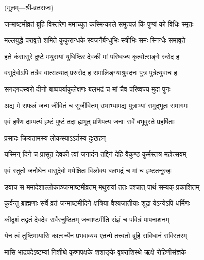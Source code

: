 \begingroup
\setlength{\parindent}{0pt}
\centerline{\small{(मूलम्—श्री-व्रतराजः)}}


\twolineshloka
{जन्माष्टमीव्रतं ब्रूहि विस्तरेण ममाच्युत}
{कस्मिन्काले समुत्पन्नं किं पुण्यं को विधिः स्मृतः}%

\twolineshloka
{मल्लयुद्धे परावृत्ते शमिते कुकुरान्धके}
{स्वजनैर्बन्धुभिः स्त्रीभिः समः स्निग्धैः समावृते}%

\twolineshloka
{हते कंसासुरे दुष्टे मथुरायां युधिष्ठिर}
{देवकी मां परिष्वज्य कृत्वोत्सङ्गे रुरोद ह}%

\twolineshloka
{वसुदेवोऽपि तत्रैव वात्सल्यात् प्ररुरोद ह}
{समालिङ्ग्याश्रुवदनः पुत्र पुत्रेत्युवाच ह}%

\twolineshloka
{सगद्गदस्वरो दीनो बाष्पपर्याकुलेक्षणः}
{बलभद्रं च मां चैव परिष्वज्य मुदा पुनः}%

\twolineshloka
{अद्य मे सफलं जन्म जीवितं च सुजीवितम्}
{उभाभ्यामद्य पुत्राभ्यां समुद्भूतः समागमः}%

\twolineshloka
{एवं हर्षेण दाम्पत्यं हृष्टं पुष्टं तदा ह्यभूत्}
{प्रणिपत्य जनाः सर्वे बभूवुस्ते प्रहर्षिताः}%

\onelineshloka
{प्रसादः क्रियतामस्य लोकस्याऽऽर्तस्य दुःखहन्}%

\twolineshloka
{यस्मिन् दिने च प्रासूत देवकी त्वां जनार्दन}
{तद्दिनं देहि वैकुण्ठ कुर्मस्तत्र महोत्सवम्}%

\twolineshloka
{एवं स्तुतो जनौघेन वासुदेवो मयेक्षितः}
{विलोक्य बलभद्रं च मां च हृष्टतनूरुहः}%

\twolineshloka
{उवाच स ममादेशाल्लोकाञ्जन्माष्टमीव्रतम्}
{मथुरायां ततः पश्चात् पार्थ सम्यक् प्रकाशितम्}%

\twolineshloka
{कुर्वन्तु ब्राह्मणाः सर्वे व्रतं जन्माष्टमीदिने}
{क्षत्रिया वैश्यजातीयाः शूद्रा येऽन्येऽपि धर्मिणः}%

\twolineshloka
{कीदृशं तद्व्रतं देवदेव सर्वैरनुष्ठितम्}
{जन्माष्टमीति संज्ञं च पवित्रं पापनाशनम्}%

\twolineshloka
{येन त्वं तुष्टिमायासि कार्त्स्न्येन प्रभवाव्यय}
{एतन्मे तत्त्वतो ब्रूहि सविधानं सविस्तरम्}%


\twolineshloka
{मासि भाद्रपदेऽष्टम्यां निशीथे कृष्णपक्षके}
{शशाङ्के वृषराशिस्थे ऋक्षे रोहिणीसंज्ञके}%

